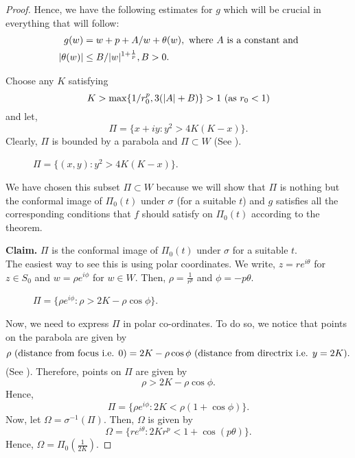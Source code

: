 \begin{proof}
	\noindent Hence, we have the following estimates 
	for \( g \) which will be crucial in everything that will follow:
	\begin{align}
		g(w)&=w+p+A /w+\theta (w),\text{ where \( A \) is a constant and} \label{eqn3.1}\\
		|\theta (w)|&\le B /|w|^{1+\frac{1}{p}}, B>0 \label{eqn3.2}
	.\end{align}

	\noindent Choose any \( K \) satisfying \[
	K>\max\{ 1 /r_0^p,3(|A|+B) \}>1 \text{ (as \( r_0<1 \))}
	\]  and let, \[
		\Pi=\{x+iy:y^2>4K(K-x)\}
	.\] Clearly, \( \Pi \) is bounded by a parabola and \( \Pi\subset W \) (See ).
\begin{figure}[ht]
    \centering
	\caption{$\Pi=\{(x,y):y^2>4K(K-x)\}$.}
    \label{parabola}
\end{figure}

	We have chosen this subset \( \Pi\subset W \) because we will show that \( \Pi \)
	is nothing but the conformal image of \( \Pi_0(t) \) under \( \sigma \) (for a suitable \( t \)) and
	\( g \) satisfies all the corresponding conditions that \( f \) should satisfy on \( \Pi_0(t) \) according to the
	theorem.\\
	\vspace{1pt}

	\noindent \textbf{Claim.} \( \Pi \) is the conformal image of \( \Pi_0(t) \) under \( \sigma \) for a suitable \( t \).\\
	The easiest way to see this is using polar coordinates. We write, \( z=re^{i\theta } \) for \( z\in S_0 \) 
	and \( w=\rho e^{i \phi } \) for \( w\in W \). Then, \( \rho=\frac{1}{r^p} \) and \( \phi=-p\theta  \).

	\begin{figure}[ht]
		\centering
		\caption{$\Pi=\{\rho e^{i\phi}:\rho>2K-\rho\cos\phi\}$.}
		\label{parabola2}
	\end{figure}
	
	Now, we need to express \( \Pi  \) in polar co-ordinates. To do so, we notice that points on the parabola are given by \[
		\rho \text{ (distance from focus i.e. \( 0 \))}= 2K-\rho \cos \phi \text{ (distance from directrix i.e. \( y=2K \))}
	.\] (See ).
	Therefore, points on \( \Pi \) are given by \[
		\rho > 2K-\rho \cos \phi 
	.\] 
	Hence, \[
		\Pi=\{\rho e^{i\phi }:2K<\rho (1+\cos \phi )\}
	.\] Now, let \( \Omega=\sigma^{-1}(\Pi) \).
	Then, \( \Omega \) is given by \[
		\Omega=\{re^{i \theta }:2Kr^p<1+\cos (p\theta )\}
.\] Hence, \( \Omega=\Pi_0\left(\frac{1}{2K}\right) \).


\end{proof}
